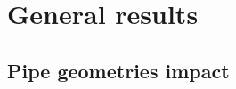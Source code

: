 \documentclass[a4paper, 11pt, twoside, openright]{report}
\begin{document}





\section{General results} \label{sec:general}

\subsection{Pipe geometries impact}
\end{document}
